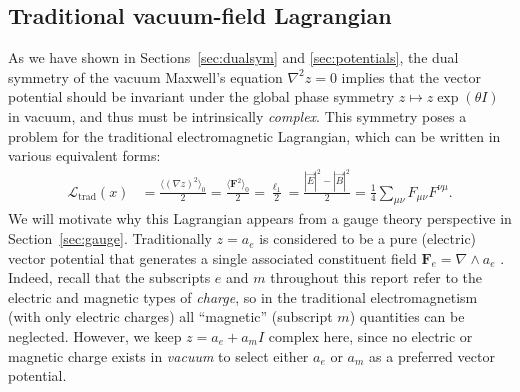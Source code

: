\documentclass[1p,sort&compress]{elsarticle}
\numberwithin{equation}{section}
\newcommand{\rv}[1]{\vec{#1}}
\newcommand{\bv}[1]{\mathbf{#1}}
\newcommand{\mean}[1]{\langle #1 \rangle}
\begin{document}

\subsection{Traditional vacuum-field Lagrangian}


As we have shown in Sections~\ref{sec:dualsym} and \ref{sec:potentials}, the dual symmetry of the vacuum Maxwell's equation $\nabla^2 z = 0$ implies that the vector potential should be invariant under the global phase symmetry $z \mapsto z \exp(\theta I)$ in vacuum, and thus must be intrinsically \emph{complex}.  This symmetry poses a problem for the traditional electromagnetic Lagrangian, which can be written in various equivalent forms:
\begin{align}\label{eq:traditional}
  \mathcal{L}_{\text{trad}}(x) &= \frac{\mean{(\nabla z)^2}_0}{2} = \frac{\mean{\bv{F}^2}_0}{2} = \frac{\ell_1}{2} = \frac{|\rv{E}|^2 - |\rv{B}|^2}{2} = \frac{1}{4}\sum_{\mu\nu}F_{\mu\nu}F^{\nu\mu}.
\end{align}
We will motivate why this Lagrangian appears from a gauge theory perspective in Section~\ref{sec:gauge}. Traditionally $z = a_e$ is considered to be a pure (electric) vector potential that generates a single associated constituent field $\bv{F}_e = \nabla\wedge a_e$ \cite{Soper1976,Jackson1999,Thide2011}.  Indeed, recall that the subscripts $e$ and $m$ throughout this report refer to the electric and magnetic types of \emph{charge}, so in the traditional electromagnetism (with only electric charges) all ``magnetic'' (subscript $m$) quantities can be neglected.  However, we keep $z = a_e + a_m I$ complex here, since no electric or magnetic charge exists in \emph{vacuum} to select either $a_e$ or $a_m$ as a preferred vector potential.
\end{document}

